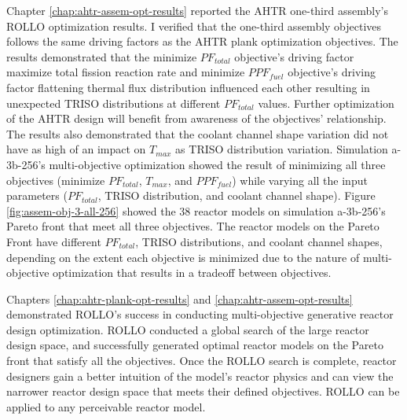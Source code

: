 Chapter \ref{chap:ahtr-assem-opt-results} reported the \gls{AHTR} one-third assembly's
\gls{ROLLO} optimization results.
I verified that the one-third assembly objectives follows the same driving 
factors as the \gls{AHTR} plank optimization objectives. 
The results demonstrated that the minimize $PF_{total}$ objective's driving factor 
maximize total fission reaction rate and minimize $PPF_{fuel}$ objective's driving 
factor flattening thermal flux distribution influenced each other resulting in unexpected 
TRISO distributions at different $PF_{total}$ values. 
Further optimization of the \gls{AHTR} design will benefit from awareness 
of the objectives' relationship. 
The results also demonstrated that the coolant channel shape variation did 
not have as high of an impact on $T_{max}$ as \gls{TRISO} distribution variation.
Simulation a-3b-256's multi-objective optimization showed the result of minimizing all 
three objectives (minimize $PF_{total}$, $T_{max}$, and $PPF_{fuel}$) while varying 
all the input parameters ($PF_{total}$, TRISO distribution, and coolant channel shape).
Figure \ref{fig:assem-obj-3-all-256} showed the 38 reactor models on simulation 
a-3b-256's Pareto front that meet all three objectives. 
The reactor models on the Pareto Front have different $PF_{total}$, TRISO distributions, 
and coolant channel shapes, depending on the extent each objective is minimized due 
to the nature of multi-objective optimization that results in a tradeoff between 
objectives. 

Chapters \ref{chap:ahtr-plank-opt-results} and \ref{chap:ahtr-assem-opt-results} 
demonstrated \gls{ROLLO}'s success in conducting multi-objective generative reactor 
design optimization. 
\gls{ROLLO} conducted a global search of the large reactor design space, and successfully 
generated optimal reactor models on the Pareto front that satisfy all the objectives. 
Once the \gls{ROLLO} search is complete, reactor designers gain a better intuition of 
the model's reactor physics and can view the narrower reactor design space that meets 
their defined objectives. 
\gls{ROLLO} can be applied to any perceivable reactor model.  



